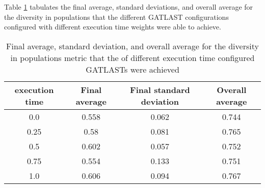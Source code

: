 Table \ref{tab:HP:GA:ExecutionTime:diversity in populations} tabulates the final average, standard deviations, and overall average for the diversity in populations that the different GATLAST configurations configured with different execution time weights were able to achieve.
\begin{table}[tbh!]
\centering
\begin{adjustbox}{trim=0cm 0cm 0cm 0cm, clip=true}
\begin{tabular}{|c|c|c|c|}
\hline
execution time & Final average & Final standard deviation & Overall average\\
\hline
0.0 & 0.558 & 0.062 & 0.744\\\hline
0.25 & 0.58 & 0.081 & 0.765\\\hline
0.5 & 0.602 & 0.057 & 0.752\\\hline
0.75 & 0.554 & 0.133 & 0.751\\\hline
1.0 & 0.606 & 0.094 & 0.767\\\hline
\end{tabular}
\end{adjustbox}
\caption{Final average, standard deviation, and overall average for the diversity in populations metric that the of different execution time configured GATLASTs were achieved}
\label{tab:HP:GA:ExecutionTime:diversity in populations}
\end{table}